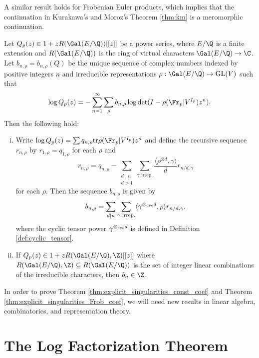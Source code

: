 \documentclass[12pt]{amsart}
\theoremstyle{plain}
\begin{document}
A similar result holds for Frobenian Euler products, which implies that the continuation in Kurakawa's and Moroz's Theorem \ref{thm:km} is a meromorphic continuation.

\begin{theorem}\label{thm:explicit_singularities_Frob_coef}
    Let $Q_p(z)\in 1+zR(\Gal(E/\Q))[[z]]$ be a power series, where $E/\Q$ is a finite extension and $R(\Gal(E/\Q))$ is the ring of virtual characters $\Gal(E/\Q)\to \C$. Let $b_{n,\rho} = b_{n,\rho}(Q)$ be the unique sequence of complex numbers indexed by positive integers $n$ and irreducible representations $\rho:\Gal(E/\Q)\to {\rm GL}(V)$ such that
    \[
        \log Q_p(z) = -\sum_{n=1}^{\infty}\sum_{\rho} b_{n,\rho} \log\det(I-\rho(\Fr_p|V^{I_p})z^n).
    \]
    Then the following hold:
    \begin{enumerate}[(i)]
        \item Write $\log Q_p(z)=\sum q_{n,\rho}{\rm tr}\rho(\Fr_p|V^{I_p})z^n$ and define the recursive sequence $r_{n,\rho}$ by $r_{1,\rho} = q_{1,\rho}$ for each $\rho$ and
        \[
            r_{n,\rho} = q_{n,\rho} - \sum_{\substack{d\mid n\\d>1}}\sum_{\gamma\text{ irrep.}}\frac{\langle\rho^{\otimes d},\gamma\rangle}{d}r_{n/d,\gamma}
        \]
        for each $\rho$. Then the sequence $b_{n,\rho}$ is given by
        \[
            b_{n,\rho} = \sum_{d\mid n}\sum_{\gamma\text{ irrep.}} \langle \gamma^{\otimes_{\rm cyc} d},\rho\rangle r_{n/d,\gamma},
        \]
        where the cyclic tensor power $\gamma^{\otimes_{\rm cyc} d}$ is defined in Definition \ref{def:cyclic_tensor}.
        \item If $Q_p(z) \in 1 + zR(\Gal(E/\Q),\Z)[[z]]$ where $R(\Gal(E/\Q),\Z)\subseteq R(\Gal(E/\Q))$ is the set of integer linear combinations of the irreducible characters, then $b_n\in \Z$.
    \end{enumerate}
\end{theorem}

In order to prove Theorem \ref{thm:explicit_singularities_const_coef} and Theorem \ref{thm:explicit_singularities_Frob_coef}, we will need new results in linear algebra, combinatorics, and representation theory.






\section{The Log Factorization Theorem}
\end{document}
